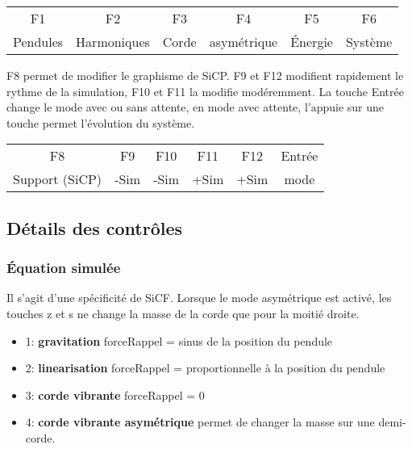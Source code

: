 \begin{center}
\begin{tabular}{cccccc}
\sf F1 &\sf F2 &\sf F3 &\sf F4 &\sf F5 &\sf F6\\
Pendules & Harmoniques & Corde & asymétrique & Énergie & Système \\
\end{tabular}
\end{center}
%
{\sf F8} permet de modifier  le graphisme de SiCP. {\sf F9} et {\sf F12} modifient rapidement le rythme de la simulation, {\sf F10} et {\sf F11} la modifie modéremment. La touche {\sf Entrée} change le mode avec ou sans attente, en mode avec attente, l'appuie sur une touche permet l'évolution du système.
\begin{center}
\begin{tabular}{cccccc}
\sf F8 &\sf F9 &\sf F10 &\sf F11 &\sf F12 & \sf Entrée \\
Support (SiCP) & -Sim & -Sim & +Sim & +Sim & mode\\
\end{tabular}
\end{center}
%
\subsection{Détails des contrôles}
%
%
\subsubsection{Équation simulée}
%
Il s'agit d'une spécificité de SiCF. Lorsque le mode asymétrique est activé, les touches {\sf z} et {\sf s} ne change la masse de la corde que pour la moitié droite. 
%
\begin{itemize}[leftmargin=2cm, label=, itemsep=0pt]%
\item 1: {\bf gravitation} forceRappel = sinus de la position du pendule
\item 2: {\bf linearisation} forceRappel = proportionnelle à la position du pendule
\item 3: {\bf corde vibrante} forceRappel = 0
\item 4: {\bf corde vibrante asymétrique} permet de changer la masse sur une demi-corde.
\end{itemize}
%
